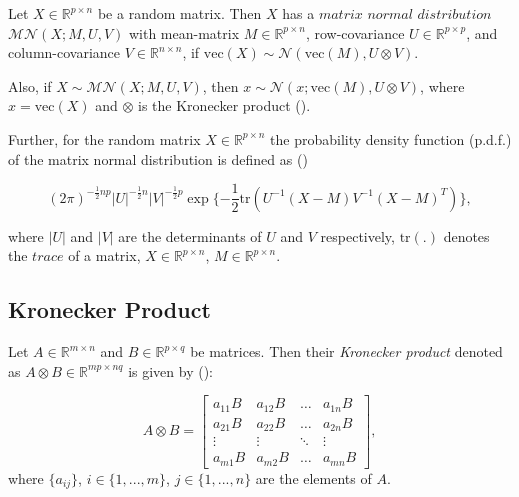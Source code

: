 \documentclass{mldsmsc}
\begin{document}
\begin{definition}
    Let $X \in \mathbb{R}^{p \times n}$ be a random matrix. Then $X$ has a $\textit{matrix normal distribution}$ $\mathcal{MN}(X; M, U, V)$ with mean-matrix $M \in \mathbb{R}^{p \times n}$, row-covariance $U \in \mathbb{R}^{p \times p}$, and column-covariance $V \in \mathbb{R}^{n \times n}$, if $\text{vec}(X) \sim \mathcal{N}(\text{vec}(M), U \otimes V)$.
\end{definition}

\noindent Also, if $X \sim \mathcal{MN}(X; M, U, V)$, then $x \sim \mathcal{N}(x; \text{vec}(M), U \otimes V)$, where $x = \text{vec}(X)$ and $\otimes$ is the Kronecker product (\cite{gupta}). \newline

\noindent Further, for the random matrix $X \in \mathbb{R}^{p \times n}$ the probability density function (p.d.f.) of the matrix normal distribution is defined as (\cite{gupta})

\begin{equation}
    (2\pi)^{-\frac{1}{2}np} |U|^{-\frac{1}{2}n} |V|^{-\frac{1}{2}p} \exp{\{-\frac{1}{2}\text{tr}(U^{-1}(X - M)V^{-1}(X - M)^{T})\}},
\end{equation}

\noindent where $|U|$ and $|V|$ are the determinants of $U$ and $V$ respectively, $\text{tr}(.)$ denotes the $\textit{trace}$ of a matrix, $X \in \mathbb{R}^{p \times n}$, $M \in \mathbb{R}^{p \times n}$.

\subsection{Kronecker Product}

\begin{definition}
Let $A \in \mathbb{R}^{m \times n}$ and $B \in \mathbb{R}^{p \times q}$ be matrices. Then their \textit{Kronecker product} denoted as $A \otimes B \in \mathbb{R}^{mp \times nq}$ is given by (\cite{alma993596394401591}):

\begin{equation}
    A \otimes B = \begin{bmatrix}
        a_{11}B & a_{12}B & \hdots & a_{1n}B \\
        a_{21}B & a_{22}B & \hdots & a_{2n}B \\
        \vdots & \vdots & \ddots & \vdots \\
        a_{m1}B & a_{m2}B & \hdots & a_{mn}B
    \end{bmatrix},
\end{equation}
where $\{a_{ij}\}$, $i \in \{1,...,m\}$, $j \in \{1, ..., n\}$ are the elements of $A$.
\end{definition}
\end{document}
